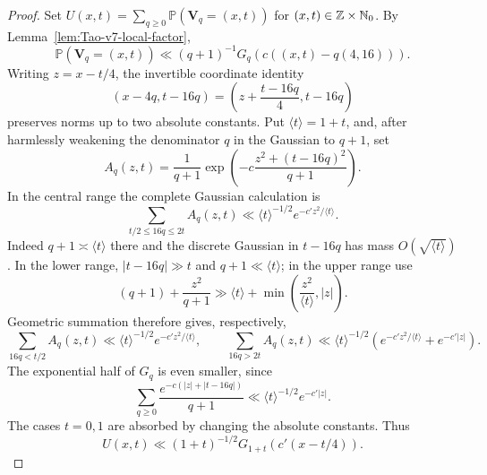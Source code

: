 \begin{proof}
Set
\(U(x,t)=\sum_{q\ge0}\mathbb P(\mathbf V_q=(x,t))\) for
\((x,t)\in\mathbb Z\times\mathbb{N}_{0}\).  By
Lemma~\ref{lem:Tao-v7-local-factor},
\[
 \mathbb P(\mathbf V_q=(x,t))
 \ll(q+1)^{-1}G_q(c((x,t)-q(4,16))).
\]
Writing \(z=x-t/4\), the invertible coordinate identity
\[
 (x-4q,t-16q)=\left(z+\frac{t-16q}{4},t-16q\right)
\]
preserves norms up to two absolute constants.  Put
\(\langle t\rangle=1+t\), and, after harmlessly weakening the denominator
\(q\) in the Gaussian to \(q+1\), set
\[
 A_q(z,t)=\frac1{q+1}
 \exp\left(-c\frac{z^2+(t-16q)^2}{q+1}\right).
\]
In the central range the complete Gaussian calculation is
\[
 \sum_{t/2\le16q\le2t}A_q(z,t)
 \ll \langle t\rangle^{-1/2}
 e^{-c'z^2/\langle t\rangle}.
\]
Indeed \(q+1\asymp\langle t\rangle\) there and the discrete Gaussian in
\(t-16q\) has mass \(O(\sqrt{\langle t\rangle})\).  In the lower range,
\(|t-16q|\gg t\) and \(q+1\ll\langle t\rangle\); in the upper range use
\[
 (q+1)+\frac{z^2}{q+1}
 \gg \langle t\rangle+\min\left(
 \frac{z^2}{\langle t\rangle},|z|\right).
\]
Geometric summation therefore gives, respectively,
\[
 \sum_{16q<t/2}A_q(z,t)
 \ll\langle t\rangle^{-1/2}e^{-c'z^2/\langle t\rangle},
 \qquad
 \sum_{16q>2t}A_q(z,t)
 \ll\langle t\rangle^{-1/2}
 \left(e^{-c'z^2/\langle t\rangle}+e^{-c'|z|}\right).
\]
The exponential half of \(G_q\) is even smaller, since
\[
 \sum_{q\ge0}\frac{e^{-c(|z|+|t-16q|)}}{q+1}
 \ll\langle t\rangle^{-1/2}e^{-c'|z|}.
\]
The cases \(t=0,1\) are absorbed by changing the absolute constants.  Thus
\[
 U(x,t)\ll(1+t)^{-1/2}G_{1+t}(c'(x-t/4)).
\]


\end{proof}
